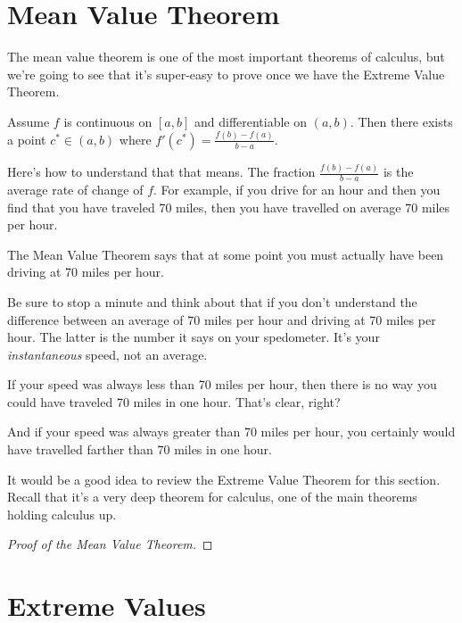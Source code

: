 \documentclass[11pt]{book}
\newcounter{tiein}[chapter]
\numberwithin{example}{chapter}
\begin{document}
\section{Mean Value Theorem}

The mean value theorem is one of the most important theorems of calculus, but we're going to see that it's super-easy to prove once we have the Extreme Value Theorem.  


\begin{theorem}
Assume $f$ is continuous on $[a,b]$ and differentiable on $(a,b)$.  Then there exists a point $c^*\in (a,b)$ where $f'(c^*)=\frac{f(b)-f(a)}{b-a}$.
\end{theorem}

Here's how to understand that that means.  The fraction $\frac{f(b)-f(a)}{b-a}$ is the average rate of change of $f$.  For example, if you drive for an hour and then you find that you have traveled 70 miles, then you have travelled on average 70 miles per hour.  

The Mean Value Theorem says that at some point you must actually have been driving at 70 miles per hour. 

Be sure to stop a minute and think about that if you don't understand the difference between an average of 70 miles per hour and driving at 70 miles per hour.  The latter is the number it says on your spedometer.  It's your \emph{instantaneous} speed, not an average.  

If your speed was always less than 70 miles per hour, then there is no way you could have traveled 70 miles in one hour.  That's clear, right?  

And if your speed was always greater than 70 miles per hour, you certainly would have travelled farther than 70 miles in one hour.  


\begin{tiein}
It would be a good idea to review the Extreme Value Theorem for this section.  Recall that it's a very deep theorem for calculus, one of the main theorems holding calculus up.
\end{tiein}


\begin{proof}[Proof of the Mean Value Theorem]


\end{proof}





\section{Extreme Values}
\end{document}
